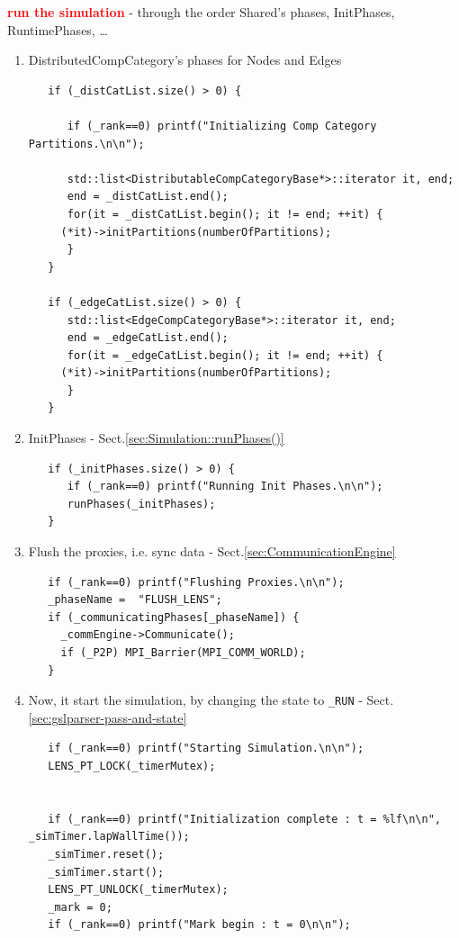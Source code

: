 \textcolor{red}{\bf run the simulation} - through the order Shared's phases,
InitPhases, RuntimePhases,
\ldots
\begin{enumerate}
  
  \item DistributedCompCategory's phases for Nodes and Edges
  
\begin{verbatim}
   if (_distCatList.size() > 0) {

      if (_rank==0) printf("Initializing Comp Category Partitions.\n\n");

      std::list<DistributableCompCategoryBase*>::iterator it, end;
      end = _distCatList.end();
      for(it = _distCatList.begin(); it != end; ++it) {
	 (*it)->initPartitions(numberOfPartitions);
      }
   }
   
   if (_edgeCatList.size() > 0) {
      std::list<EdgeCompCategoryBase*>::iterator it, end;
      end = _edgeCatList.end();
      for(it = _edgeCatList.begin(); it != end; ++it) {
	 (*it)->initPartitions(numberOfPartitions);
      }
   }   
\end{verbatim}

  \item InitPhases - Sect.\ref{sec:Simulation::runPhases()}
  
  
\begin{verbatim}
   if (_initPhases.size() > 0) {
      if (_rank==0) printf("Running Init Phases.\n\n");
      runPhases(_initPhases);
   }
\end{verbatim}


  \item Flush the proxies, i.e. sync data - Sect.\ref{sec:CommunicationEngine}
  
\begin{verbatim}
   if (_rank==0) printf("Flushing Proxies.\n\n");
   _phaseName =  "FLUSH_LENS";
   if (_communicatingPhases[_phaseName]) {
     _commEngine->Communicate();
     if (_P2P) MPI_Barrier(MPI_COMM_WORLD);
   }
\end{verbatim}

  
   \item Now, it start the simulation, by changing the state to \verb!_RUN! -
   Sect.\ref{sec:gslparser-pass-and-state}

\begin{verbatim}
   if (_rank==0) printf("Starting Simulation.\n\n");
   LENS_PT_LOCK(_timerMutex);


   if (_rank==0) printf("Initialization complete : t = %lf\n\n", _simTimer.lapWallTime());
   _simTimer.reset();
   _simTimer.start();
   LENS_PT_UNLOCK(_timerMutex);
   _mark = 0;
   if (_rank==0) printf("Mark begin : t = 0\n\n");


\end{verbatim}
\end{enumerate}
